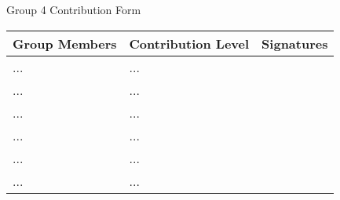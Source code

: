 
\thispagestyle{empty} %

\vspace{0.25\textheight}
\begin{center}
    \LARGE Group 4 Contribution Form\\
    \Large
    \vspace{0.05\textheight}
    \begin{tabular}[0.9\textwidth]{@{}|m{}|m{}|m{}|@{}}
        \hline
        \textbf{Group Members} & \textbf{Contribution Level} & \textbf{Signatures} \\
        \hline
        ... & ... & \\
        \hline
        ... & ... & \\
        \hline
        ... & ... & \\
        \hline
        ... & ... & \\
        \hline
        ... & ... & \\
        \hline
        ... & ... & \\
        \hline
    \end{tabular}
\end{center}
\clearpage
{}
\newpage

